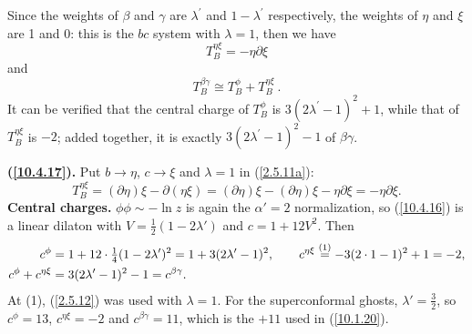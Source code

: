 	\noindent Since the weights of $\beta$ and $\gamma$ are $\lambda^{\prime}$ and $1-\lambda^{\prime}$ respectively, the weights of $\eta$ and $\xi$ are 1 and 0: this is the $bc$ system with $\lambda=1$, then we have
	\begin{equation}
		T_{B}^{\eta\xi} = -\eta \partial\xi \label{10.4.17}
	\end{equation}
	and
	\begin{equation}
		T_{B}^{\beta\gamma} \cong T_{B}^{\phi} + T_{B}^{\eta\xi} \:. \label{10.4.18}
	\end{equation}
	It can be verified that the central charge of $T_{B}^{\phi}$ is $3(2\lambda^{\prime}-1)^{2}+1$, while that of $T_{B}^{\eta\xi}$ is $-2$; added together, it is exactly $3(2\lambda^{\prime}-1)^{2}-1$ of $\beta\gamma$.
	\begin{tcolorbox}[breakable]
		\begin{remark}
			\textbf{(\ref{10.4.17}).} Put $b\to\eta$, $c\to\xi$ and $\lambda=1$ in (\ref{2.5.11a}):
			\begin{equation*}
				T^{\eta\xi}_B=(\partial\eta)\xi-\partial(\eta\xi)=(\partial\eta)\xi-(\partial\eta)\xi-\eta\partial\xi=-\eta\partial\xi .
			\end{equation*}
			\textbf{Central charges.} $\phi\phi\sim-\ln z$ is again the $\alpha'=2$ normalization, so (\ref{10.4.16}) is a linear dilaton with $V=\tfrac12(1-2\lambda')$ and $c=1+12V^2$. Then
			\begin{align*}
				c^{\phi}&=1+12\cdot\tfrac14(1-2\lambda')^{2}=1+3(2\lambda'-1)^{2},\qquad
				c^{\eta\xi}\overset{(1)}{=}-3(2\cdot1-1)^{2}+1=-2,\\
				c^{\phi}+c^{\eta\xi}&=3(2\lambda'-1)^{2}-1=c^{\beta\gamma} .
			\end{align*}
			At (1), (\ref{2.5.12}) was used with $\lambda=1$. For the superconformal ghosts, $\lambda'=\tfrac32$, so $c^\phi=13$, $c^{\eta\xi}=-2$ and $c^{\beta\gamma}=11$, which is the $+11$ used in (\ref{10.1.20}).
		\end{remark}
	\end{tcolorbox}
	
